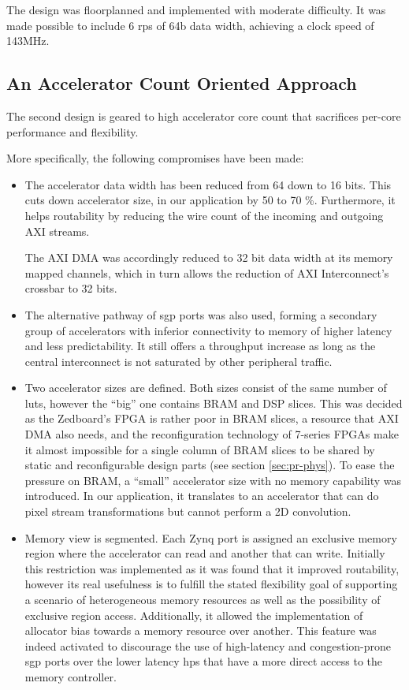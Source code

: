 The design was floorplanned and implemented with moderate difficulty.
It was made possible to include 6 \glspl{rp} of 64b data width,
achieving a clock speed of 143MHz.


\subsection{An Accelerator Count Oriented Approach}

The second design is geared to high accelerator core count
that sacrifices per-core performance and flexibility.

More specifically, the following compromises have been made:

\begin{itemize}
\item	The accelerator data width has been reduced from 64 down to 16 bits.
	This cuts down accelerator size, in our application by 50 to 70 \%.
	Furthermore, it helps routability by reducing the wire count of the
	incoming and outgoing AXI streams.

	The AXI DMA was accordingly reduced to 32 bit data width at its memory mapped channels,
	which in turn allows the reduction of AXI Interconnect's crossbar to 32 bits.

\item	The alternative pathway of \gls{sgp} ports was also used, forming a secondary
	group of accelerators with inferior connectivity to memory of higher latency
	and less predictability.
	It still offers a throughput increase as long as the central interconnect is not
	saturated by other peripheral traffic.

\item	Two accelerator sizes are defined.
	Both sizes consist of the same number of \glspl{lut},
	however the ``big'' one contains BRAM and DSP slices. This was decided as the
	Zedboard's FPGA is rather poor in BRAM slices, a resource that AXI DMA also needs,
	and the reconfiguration technology of 7-series FPGAs make it almost impossible
	for a single column of BRAM slices to be shared by static and reconfigurable
	design parts (see section \ref{sec:pr-phys}).
	To ease the pressure on BRAM, a ``small'' accelerator size with no memory capability was
	introduced. In our application, it translates to an accelerator that can do
	pixel stream transformations but cannot perform a 2D convolution.

\item	Memory view is segmented. Each Zynq port is assigned an exclusive memory region
	where the accelerator can read and another that can write.
	Initially this restriction was implemented as it was found that it improved routability,
	however its real usefulness is to fulfill the stated flexibility goal of supporting
	a scenario of heterogeneous memory resources as well as the possibility of exclusive region access.
	Additionally, it allowed the implementation of allocator bias towards a memory resource over another.
	This feature was indeed activated to discourage the use of high-latency and
	congestion-prone \gls{sgp} ports over the lower latency \glspl{hp} that have a more direct access
	to the memory controller.
\end{itemize}

